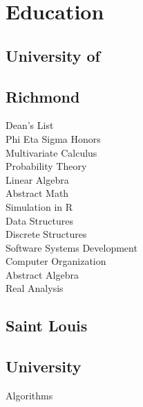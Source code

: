 \documentclass{resume}
\begin{document}

%
%

\begin{minipage}[t]{0.33\textwidth}


\section{Education}

\subsection{University of}
\subsection{Richmond}
Dean's List\\
Phi Eta Sigma Honors \\
{}
Multivariate Calculus\\
Probability Theory \\
Linear Algebra \\
Abstract Math\\
Simulation in R\\
Data Structures\\
Discrete Structures\\
Software Systems Development\\
Computer Organization\\
Abstract Algebra\\
Real Analysis\\
\sectionsep

\subsection{Saint Louis}
\subsection{University}
{}
Algorithms\\
\sectionsep


\end{minipage}
\end{document}
